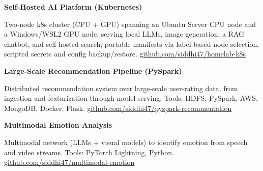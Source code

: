         \vspace{0.1 cm}
        \begin{twocolentry}{
        }
            \textbf{Self-Hosted AI Platform (Kubernetes)}\end{twocolentry}
        \vspace{0.06 cm}
        \begin{onecolentry}
            \begin{highlights}
                \item Two-node k8s cluster (CPU + GPU) spanning an Ubuntu Server CPU node and a Windows/WSL2 GPU node, serving local LLMs, image generation, a RAG chatbot, and self-hosted search; portable manifests via label-based node selection, scripted secrets and config backup/restore. \href{https://github.com/siddhi47/homelab-k8s}{github.com/siddhi47/homelab-k8s}
            \end{highlights}
        \end{onecolentry}

        \vspace{0.1 cm}
        \begin{twocolentry}{
        }
            \textbf{Large-Scale Recommendation Pipeline (PySpark)}\end{twocolentry}
        \vspace{0.06 cm}
        \begin{onecolentry}
            \begin{highlights}
                \item Distributed recommendation system over large-scale user-rating data, from ingestion and featurization through model serving. Tools: HDFS, PySpark, AWS, MongoDB, Docker, Flask. \href{https://github.com/siddhi47/pyspark-recommentation}{github.com/siddhi47/pyspark-recommentation}
            \end{highlights}
        \end{onecolentry}

        \vspace{0.1 cm}
        \begin{twocolentry}{
        }
            \textbf{Multimodal Emotion Analysis}\end{twocolentry}
        \vspace{0.06 cm}
        \begin{onecolentry}
            \begin{highlights}
                \item Multimodal network (LLMs + visual models) to identify emotion from speech and video streams. Tools: PyTorch Lightning, Python. \href{https://github.com/siddhi47/multimodal-emotion}{github.com/siddhi47/multimodal-emotion}
            \end{highlights}
        \end{onecolentry}

